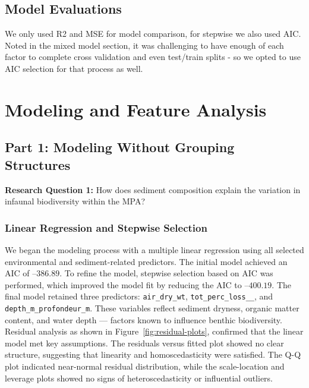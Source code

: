 \documentclass[12pt]{article}
\begin{document}
\subsection{Model Evaluations}

\qquad We only used R2 and MSE for model comparison, for stepwise we also used
AIC. Noted in the mixed model section, it was challenging to have enough of each
factor to complete cross validation and even test/train splits - so we opted to
use AIC selection for that process as well. 


\newpage

\section{Modeling and Feature Analysis}

\subsection{Part 1: Modeling Without Grouping Structures}

\textbf{Research Question 1:} How does sediment composition explain the variation in infaunal biodiversity within the MPA?

\subsubsection{Linear Regression and Stepwise Selection}

\qquad We began the modeling process with a multiple linear regression using all
selected environmental and sediment-related predictors. The initial model
achieved an AIC of $–386.89$. To refine the model, stepwise selection based on
AIC was performed, which improved the model fit by reducing the AIC to
$–400.19$. The final model retained three predictors: \texttt{air\_dry\_wt},
\texttt{tot\_perc\_loss\_\_}, and \texttt{depth\_m\_profondeur\_m}. These
variables reflect sediment dryness, organic matter content, and water depth —
factors known to influence benthic biodiversity. Residual analysis as shown in
Figure~\ref{fig:residual-plots}, confirmed that the linear model met key
assumptions. The residuals versus fitted plot showed no clear structure,
suggesting that linearity and homoscedasticity were satisfied. The Q-Q plot
indicated near-normal residual distribution, while the scale-location and
leverage plots showed no signs of heteroscedasticity or influential outliers.
\end{document}
